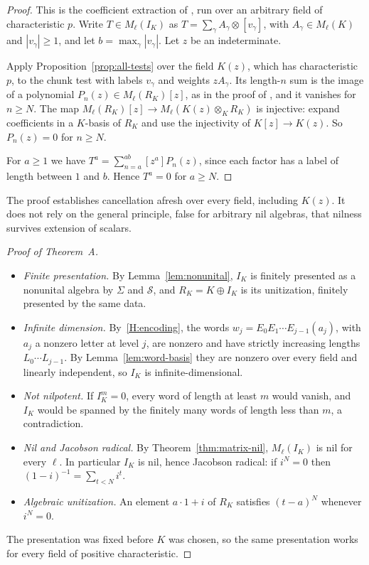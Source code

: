 \begin{proof}
This is the coefficient extraction of \cite[Theorem~3.7]{OAI247periodic}, run over an arbitrary field of characteristic
$p$. Write $T\in M_\ell(I_K)$ as $T=\sum_{\gamma}A_\gamma\otimes[v_\gamma]$, with $A_\gamma\in M_\ell(K)$ and
$|v_\gamma|\geq1$, and let $b=\max_\gamma|v_\gamma|$. Let $z$ be an indeterminate.

Apply Proposition~\ref{prop:all-tests} over the field $K(z)$, which has characteristic $p$, to the chunk test with labels
$v_\gamma$ and weights $zA_\gamma$. Its length-$n$ sum is the image of a polynomial $P_n(z)\in M_\ell(R_K)[z]$, as in the proof of
\cite[Theorem~3.7]{OAI247periodic}, and it vanishes for $n\geq N$. The map
$M_\ell(R_K)[z]\to M_\ell(K(z)\otimes_KR_K)$ is injective: expand coefficients in a $K$-basis of $R_K$ and use the
injectivity of $K[z]\to K(z)$. So $P_n(z)=0$ for $n\geq N$.

For $a\geq1$ we have $T^a=\sum_{n=a}^{ab}[z^a]P_n(z)$, since each factor has a label of length between $1$ and $b$.
Hence $T^a=0$ for $a\geq N$.
\end{proof}

The proof establishes cancellation afresh over every field, including $K(z)$. It does not rely on the general
principle, false for arbitrary nil algebras, that nilness survives extension of scalars.

\begin{proof}[Proof of Theorem~A]
\begin{itemize}[leftmargin=*]
\item \emph{Finite presentation.} By Lemma~\ref{lem:nonunital}, $I_K$ is finitely presented as a nonunital algebra by
  $\Sigma$ and $\mathcal S$, and $R_K=K\oplus I_K$ is its unitization, finitely presented by the same data.
\item \emph{Infinite dimension.} By~\ref{H:encoding}, the words $w_j=E_0E_1\cdots E_{j-1}(a_j)$, with $a_j$ a nonzero
  letter at level $j$, are nonzero and have strictly increasing lengths $L_0\cdots L_{j-1}$. By
  Lemma~\ref{lem:word-basis} they are nonzero over every field and linearly independent, so $I_K$ is
  infinite-dimensional.
\item \emph{Not nilpotent.} If $I_K^m=0$, every word of length at least $m$ would vanish, and $I_K$ would be spanned by the
  finitely many words of length less than $m$, a contradiction.
\item \emph{Nil and Jacobson radical.} By Theorem~\ref{thm:matrix-nil}, $M_\ell(I_K)$ is nil for every $\ell$. In
  particular $I_K$ is nil, hence Jacobson radical: if $i^N=0$ then $(1-i)^{-1}=\sum_{t<N}i^t$.
\item \emph{Algebraic unitization.} An element $a\cdot1+i$ of $R_K$ satisfies $(t-a)^N$ whenever $i^N=0$.
\end{itemize}
The presentation was fixed before $K$ was chosen, so the same presentation works for every field of positive
characteristic.
\end{proof}

